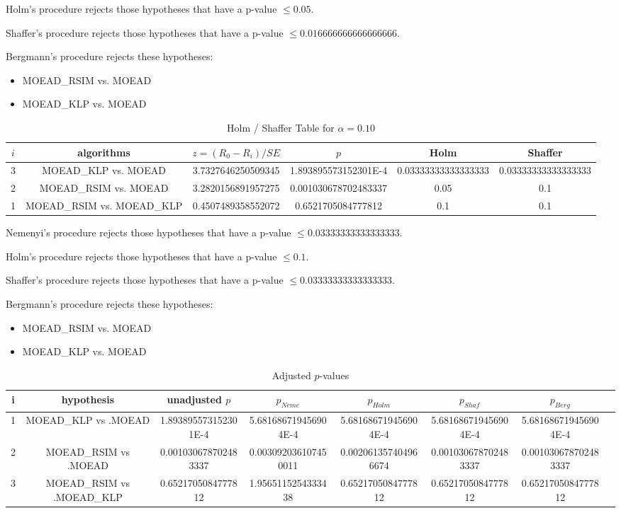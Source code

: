 \documentclass[a4paper,10pt]{article}
\begin{document}
\begin{landscape}
Holm's procedure rejects those hypotheses that have a p-value $\le0.05$.


Shaffer's procedure rejects those hypotheses that have a p-value $\le0.016666666666666666$.


Bergmann's procedure rejects these hypotheses:


\begin{itemize}


\item MOEAD_RSIM vs. MOEAD
\item MOEAD_KLP vs. MOEAD
\end{itemize}


\begin{table}[!htp]
\centering\tiny
\caption{Holm / Shaffer Table for $\alpha=0.10$}
\begin{tabular}{cccccc}
$i$&algorithms&$z=(R_0 - R_i)/SE$&$p$&Holm&Shaffer\\
\hline
3&MOEAD_KLP vs. MOEAD&3.7327646250509345&1.893895573152301E-4&0.03333333333333333&0.03333333333333333\\
2&MOEAD_RSIM vs. MOEAD&3.2820156891957275&0.001030678702483337&0.05&0.1\\
1&MOEAD_RSIM vs. MOEAD_KLP&0.4507489358552072&0.6521705084777812&0.1&0.1\\
\hline
\end{tabular}
\end{table}
Nemenyi's procedure rejects those hypotheses that have a p-value $\le0.03333333333333333$.


Holm's procedure rejects those hypotheses that have a p-value $\le0.1$.


Shaffer's procedure rejects those hypotheses that have a p-value $\le0.03333333333333333$.


Bergmann's procedure rejects these hypotheses:


\begin{itemize}


\item MOEAD_RSIM vs. MOEAD
\item MOEAD_KLP vs. MOEAD
\end{itemize}


\begin{table}[!htp]
\centering\tiny
\caption{Adjusted $p$-values}
\begin{tabular}{cccccccc}
i&hypothesis&unadjusted $p$&$p_{Neme}$&$p_{Holm}$&$p_{Shaf}$&$p_{Berg}$\\
\hline
1&MOEAD_KLP vs .MOEAD&1.893895573152301E-4&5.681686719456904E-4&5.681686719456904E-4&5.681686719456904E-4&5.681686719456904E-4\\
2&MOEAD_RSIM vs .MOEAD&0.001030678702483337&0.003092036107450011&0.002061357404966674&0.001030678702483337&0.001030678702483337\\
3&MOEAD_RSIM vs .MOEAD_KLP&0.6521705084777812&1.9565115254333438&0.6521705084777812&0.6521705084777812&0.6521705084777812\\
\hline
\end{tabular}
\end{table}

\end{landscape}
\end{document}

